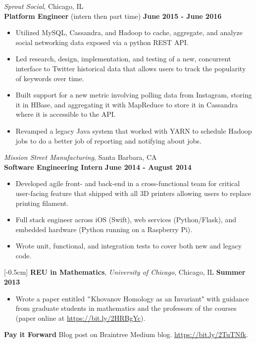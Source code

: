 \documentclass[9pt]{res} %
\begin{document}
\begin{resume}
\textit{\color{MidnightBlue}Sprout Social}, Chicago, IL \\
\textbf{Platform Engineer} (intern then part time) \hspace*{\fill} \textbf{June 2015 - June 2016}
\begin{itemize} 
\item Utilized MySQL, Cassandra, and Hadoop to cache, aggregate, and analyze social networking data exposed via a python REST API.
\item Led research, design, implementation, and testing of a new, concurrent interface to Twitter historical data that allows users to track the popularity of keywords over time.
\item Built support for a new metric involving polling data from Instagram, storing it in HBase, and aggregating it with MapReduce to store it in Cassandra where it is accessible to the API.
\item Revamped a legacy Java system that worked with YARN to schedule Hadoop jobs to do a better job of reporting and notifying about jobs.
\end{itemize}

\textit{\color{MidnightBlue}Mission Street Manufacturing}, Santa Barbara, CA \\
\textbf{Software Engineering Intern} \hspace*{\fill} \textbf{June 2014 - August 2014}
\begin{itemize}
\item Developed agile front- and back-end in a cross-functional team for critical user-facing feature that shipped with all 3D printers allowing users to replace printing filament.
\item Full stack engineer across iOS (Swift), web services (Python/Flask), and embedded hardware (Python running on a Raspberry Pi).
\item Wrote unit, functional, and integration tests to cover both new and legacy code.
\end{itemize}

\vspace{-5pt}
[-0.5cm] 
\textbf{REU in Mathematics}, \textit{University of Chicago}, Chicago, IL \hspace{\fill} \textbf{Summer 2013}
\begin{itemize} \itemsep -5pt
\item Wrote a paper entitled $``$Khovanov Homology as an Invariant" with guidance from graduate students in mathematics and the professors of the courses (paper online at \url{https://bit.ly/2HRBgYc}).
\end{itemize}
\textbf{Pay it Forward} Blog post on Braintree Medium blog. \url{https://bit.ly/2TuTNfk}.



\end{resume}
\end{document}
